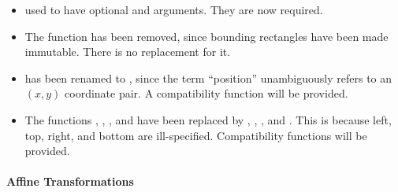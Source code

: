\begin{itemize} 
\item {} used to have optional  and
 arguments.  They are now required.

\item The function  has been removed, since
bounding rectangles have been made immutable.  There is no replacement for it.

\item {} has been renamed to
, since the term ``position'' unambiguously
refers to an $(x,y)$ coordinate pair.  A compatibility function will be
provided.

\item The functions , ,
, and  have been
replaced by , ,
, and .  This is
because left, top, right, and bottom are ill-specified.  Compatibility functions
will be provided.
\end{itemize}


\paragraph {Affine Transformations}

